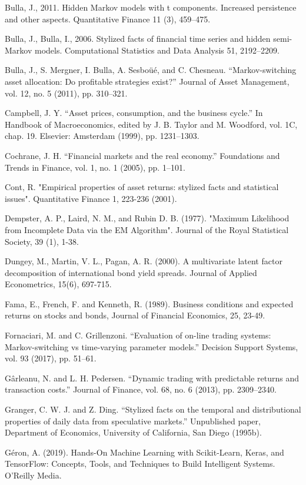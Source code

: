 Bulla, J., 2011. Hidden Markov models with t components. Increased persistence and other aspects. Quantitative Finance 11 (3), 459–475.

Bulla, J., Bulla, I., 2006. Stylized facts of financial time series and hidden semi- Markov models. Computational Statistics and Data Analysis 51, 2192–2209.

Bulla, J., S. Mergner, I. Bulla, A. Sesboüé, and C. Chesneau. “Markov-switching asset allocation: Do profitable strategies exist?” Journal of Asset Management, vol. 12, no. 5 (2011), pp. 310–321.

Campbell, J. Y. “Asset prices, consumption, and the business cycle.” In Handbook of Macroeconomics, edited by J. B. Taylor and M. Woodford, vol. 1C, chap. 19. Elsevier: Amsterdam (1999), pp. 1231–1303.

Cochrane, J. H. “Financial markets and the real economy.” Foundations and Trends in Finance, vol. 1, no. 1 (2005), pp. 1–101.

Cont, R. "Empirical properties of asset returns: stylized facts and statistical issues". Quantitative Finance 1, 223-236 (2001).

Dempster, A. P., Laird, N. M., and Rubin D. B. (1977). "Maximum Likelihood from Incomplete Data via the EM Algorithm". Journal of the Royal Statistical Society, 39 (1), 1-38.

Dungey, M., Martin, V. L., Pagan, A. R. (2000). A multivariate latent factor decomposition of international bond yield spreads. Journal of Applied Econometrics, 15(6), 697-715.

Fama, E., French, F. and Kenneth, R. (1989). Business conditions and expected returns on stocks and bonds, Journal of Financial Economics, 25, 23-49.

Fornaciari, M. and C. Grillenzoni. “Evaluation of on-line trading systems: Markov-switching vs time-varying parameter models.” Decision Support Systems, vol. 93 (2017), pp. 51–61.

Gârleanu, N. and L. H. Pedersen. “Dynamic trading with predictable returns and
transaction costs.” Journal of Finance, vol. 68, no. 6 (2013), pp. 2309–2340.

Granger, C. W. J. and Z. Ding. “Stylized facts on the temporal and distributional properties of daily data from speculative markets.” Unpublished paper, Department of Economics, University of California, San Diego (1995b).

Géron, A. (2019). Hands-On Machine Learning with Scikit-Learn, Keras, and TensorFlow: Concepts, Tools, and Techniques to Build Intelligent Systems. O’Reilly Media.

